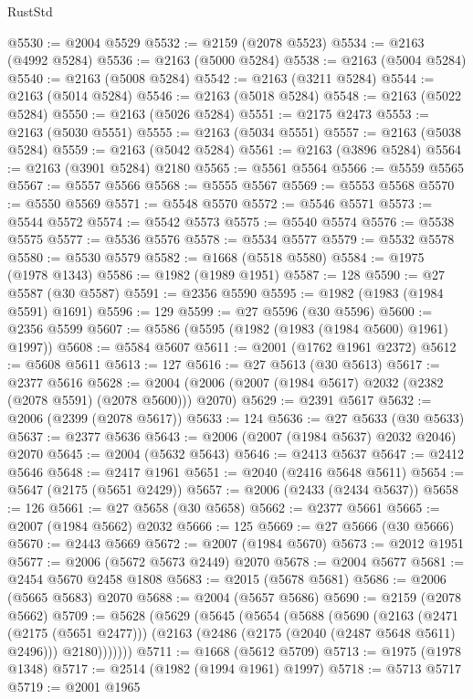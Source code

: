 \begin{lexlean}{RustStd}
\begin{coremodule}
@5530 := @2004 @5529
@5532 := @2159 (@2078 @5523)
@5534 := @2163 (@4992 @5284)
@5536 := @2163 (@5000 @5284)
@5538 := @2163 (@5004 @5284)
@5540 := @2163 (@5008 @5284)
@5542 := @2163 (@3211 @5284)
@5544 := @2163 (@5014 @5284)
@5546 := @2163 (@5018 @5284)
@5548 := @2163 (@5022 @5284)
@5550 := @2163 (@5026 @5284)
@5551 := @2175 @2473
@5553 := @2163 (@5030 @5551)
@5555 := @2163 (@5034 @5551)
@5557 := @2163 (@5038 @5284)
@5559 := @2163 (@5042 @5284)
@5561 := @2163 (@3896 @5284)
@5564 := @2163 (@3901 @5284) @2180
@5565 := @5561 @5564
@5566 := @5559 @5565
@5567 := @5557 @5566
@5568 := @5555 @5567
@5569 := @5553 @5568
@5570 := @5550 @5569
@5571 := @5548 @5570
@5572 := @5546 @5571
@5573 := @5544 @5572
@5574 := @5542 @5573
@5575 := @5540 @5574
@5576 := @5538 @5575
@5577 := @5536 @5576
@5578 := @5534 @5577
@5579 := @5532 @5578
@5580 := @5530 @5579
@5582 := @1668 (@5518 @5580)
@5584 := @1975 (@1978 @1343)
@5586 := @1982 (@1989 @1951)
@5587 := 128
@5590 := @27 @5587 (@30 @5587)
@5591 := @2356 @5590
@5595 := @1982 (@1983 (@1984 @5591) @1691)
@5596 := 129
@5599 := @27 @5596 (@30 @5596)
@5600 := @2356 @5599
@5607 := @5586 (@5595 (@1982 (@1983 (@1984 @5600) @1961) @1997))
@5608 := @5584 @5607
@5611 := @2001 (@1762 @1961 @2372)
@5612 := @5608 @5611
@5613 := 127
@5616 := @27 @5613 (@30 @5613)
@5617 := @2377 @5616
@5628 := @2004 (@2006 (@2007 (@1984 @5617) @2032 (@2382 (@2078 @5591) (@2078 @5600))) @2070)
@5629 := @2391 @5617
@5632 := @2006 (@2399 (@2078 @5617))
@5633 := 124
@5636 := @27 @5633 (@30 @5633)
@5637 := @2377 @5636
@5643 := @2006 (@2007 (@1984 @5637) @2032 @2046) @2070
@5645 := @2004 (@5632 @5643)
@5646 := @2413 @5637
@5647 := @2412 @5646
@5648 := @2417 @1961
@5651 := @2040 (@2416 @5648 @5611)
@5654 := @5647 (@2175 (@5651 @2429))
@5657 := @2006 (@2433 (@2434 @5637))
@5658 := 126
@5661 := @27 @5658 (@30 @5658)
@5662 := @2377 @5661
@5665 := @2007 (@1984 @5662) @2032
@5666 := 125
@5669 := @27 @5666 (@30 @5666)
@5670 := @2443 @5669
@5672 := @2007 (@1984 @5670)
@5673 := @2012 @1951
@5677 := @2006 (@5672 @5673 @2449) @2070
@5678 := @2004 @5677
@5681 := @2454 @5670 @2458 @1808
@5683 := @2015 (@5678 @5681)
@5686 := @2006 (@5665 @5683) @2070
@5688 := @2004 (@5657 @5686)
@5690 := @2159 (@2078 @5662)
@5709 := @5628
    (@5629
      (@5645
        (@5654
          (@5688
            (@5690
              (@2163
                (@2471 (@2175 (@5651 @2477)))
                (@2163 (@2486 (@2175 (@2040 (@2487 @5648 @5611) @2496))) @2180)))))))
@5711 := @1668 (@5612 @5709)
@5713 := @1975 (@1978 @1348)
@5717 := @2514 (@1982 (@1994 @1961) @1997)
@5718 := @5713 @5717
@5719 := @2001 @1965

\end{coremodule}
\end{lexlean}
